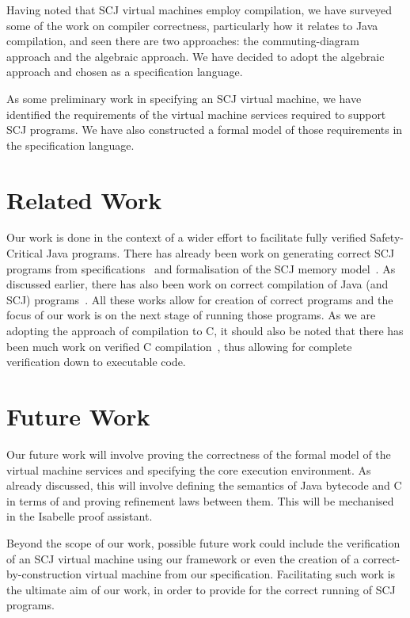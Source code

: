 \documentclass[a4paper,10pt]{report}
\begin{document}
Having noted that SCJ virtual machines employ compilation, we have surveyed some
of the work on compiler correctness, particularly how it relates to Java
compilation, and seen there are two approaches: the commuting-diagram approach
and the algebraic approach.  We have decided to adopt the algebraic approach and
chosen \Circus{} as a specification language.

As some preliminary work in specifying an SCJ virtual machine, we have
identified the requirements of the virtual machine services required to support
SCJ programs.  We have also constructed a formal model of those requirements in
the \Circus{} specification language.

\section{Related Work}
\label{related-work-section}

Our work is done in the context of a wider effort to facilitate fully verified
Safety-Critical Java programs.  There has already been work on generating
correct SCJ programs from \Circus{} specifications~\cite{cavalcanti2011,
  cavalcanti2013} and formalisation of the SCJ memory
model~\cite{cavalcanti2011a}.  As discussed earlier, there has also been work on
correct compilation of Java (and SCJ) programs~\cite{klein2006, strecker2002,
  lochbihler2010, duran2005, stark2001}.  All these works allow for creation of
correct programs and the focus of our work is on the next stage of running those
programs.  As we are adopting the approach of compilation to C, it should also
be noted that there has been much work on verified C
compilation~\cite{leroy2009a, leroy2009b, leroy2012, leinenbach2005, blazy2006},
thus allowing for complete verification down to executable code.

\section{Future Work}
\label{future-work-section}

Our future work will involve proving the correctness of the formal model of the
virtual machine services and specifying the core execution environment.  As
already discussed, this will involve defining the semantics of Java bytecode and
C in terms of \Circus and proving refinement laws between them.  This will be
mechanised in the Isabelle proof assistant.

Beyond the scope of our work, possible future work could include the
verification of an SCJ virtual machine using our framework or even the creation
of a correct-by-construction virtual machine from our specification.
Facilitating such work is the ultimate aim of our work, in order to provide for
the correct running of SCJ programs.

\raggedright
\printbibliography
\end{document}
